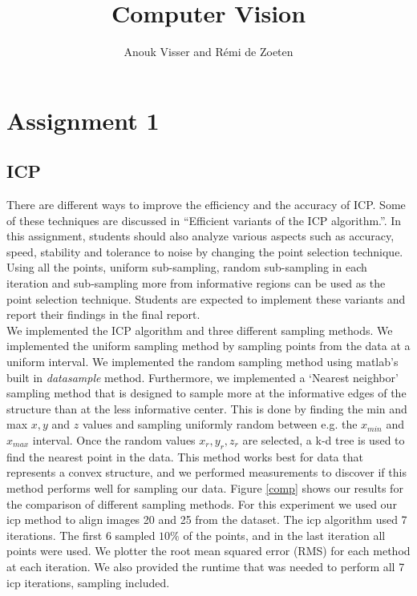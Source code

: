 \documentclass[12pt]{amsart}
\title{Computer Vision}
\author{Anouk Visser and R\'emi de Zoeten}
\date{} %
\begin{document}
\maketitle

\section{Assignment 1}
\subsection{ICP}
There are different ways to improve the efficiency and the accuracy of ICP. Some of these techniques are discussed in ``Efficient variants of the ICP algorithm.''. In this assignment, students should also analyze various aspects such as accuracy, speed, stability and tolerance to noise by changing the point selection technique. Using all the points, uniform sub-sampling, random sub-sampling in each iteration and sub-sampling more from informative regions can be used as the point selection technique. Students are expected to implement these variants and report their findings in the final report.\\

We implemented the ICP algorithm and three different sampling methods. We implemented the uniform sampling method by sampling points from the data at a uniform interval. We implemented the random sampling method using matlab's built in \textit{datasample} method. Furthermore, we implemented a `Nearest neighbor' sampling method that is designed to sample more at the informative edges of the structure than at the less informative center. This is done by finding the min and max $x, y$ and $z$ values and sampling uniformly random between e.g. the $x_{min}$ and $x_{max}$ interval. Once the random values $x_r, y_r, z_r$ are selected, a k-d tree is used to find the nearest point in the data. This method works best for data that represents a convex structure, and we performed measurements to discover if this method performs well for sampling our data.
Figure \ref{comp} shows our results for the comparison of different sampling methods. For this experiment we used our icp method to align images 20 and 25 from the dataset. The icp algorithm used 7 iterations. The first 6 sampled $10\%$ of the points, and in the last iteration all points were used. We plotter the root mean squared error (RMS) for each method at each iteration. We also provided the runtime that was needed to perform all 7 icp iterations, sampling included.
\end{document}
